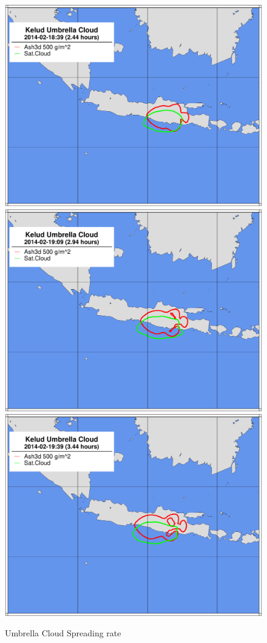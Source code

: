 \begin{figure}[htbp]
\includegraphics[angle=0,scale=0.3]{Figures/TestCase_Results/ValidTest/Kelud_CloudOutline_5.pdf}
\includegraphics[angle=0,scale=0.3]{Figures/TestCase_Results/ValidTest/Kelud_CloudOutline_6.pdf}
\includegraphics[angle=0,scale=0.3]{Figures/TestCase_Results/ValidTest/Kelud_CloudOutline_7.pdf}
\parbox{15cm}{\caption{\label{FigTestValKelud} Umbrella Cloud Spreading rate}}
\end{figure}


